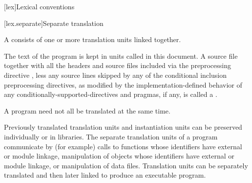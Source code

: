 [lex]{Lexical conventions}



[lex.separate]{Separate translation}

\pnum
{}%
A  consists of one or more translation units
linked together.

\pnum
{}%
%
The text of the program is kept in units called
 in this document.
A source file together with all the headers
and source files included via the preprocessing
directive , less any source lines skipped by any of the
conditional inclusion preprocessing directives,
as modified by the implementation-defined behavior of any
conditionally-supported-directives and pragmas,
if any, is called a .

\pnum
\begin{note}
A \Cpp{} program need not all be translated at the same time.
\end{note}

\pnum
\begin{note}
Previously translated translation units and instantiation
units can be preserved individually or in libraries. The separate
translation units of a program communicate by (for example)
calls to functions whose identifiers have external or module linkage,
manipulation of objects whose identifiers have external or module linkage, or
manipulation of data files. Translation units can be separately
translated and then later linked to produce an executable
program.
\end{note}

